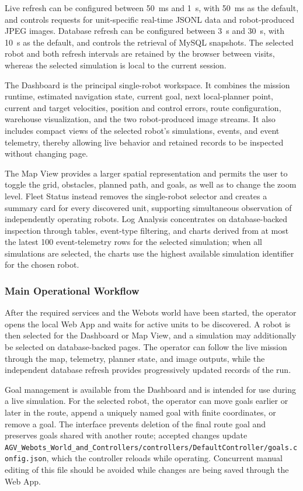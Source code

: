 Live refresh can be configured between 50~ms and 1~s, with 50~ms as the default, and controls requests for unit-specific real-time JSONL data and robot-produced JPEG images. Database refresh can be configured between 3~s and 30~s, with 10~s as the default, and controls the retrieval of MySQL snapshots. The selected robot and both refresh intervals are retained by the browser between visits, whereas the selected simulation is local to the current session.

The Dashboard is the principal single-robot workspace. It combines the mission runtime, estimated navigation state, current goal, next local-planner point, current and target velocities, position and control errors, route configuration, warehouse visualization, and the two robot-produced image streams. It also includes compact views of the selected robot's simulations, events, and event telemetry, thereby allowing live behavior and retained records to be inspected without changing page.

The Map View provides a larger spatial representation and permits the user to toggle the grid, obstacles, planned path, and goals, as well as to change the zoom level. Fleet Status instead removes the single-robot selector and creates a summary card for every discovered unit, supporting simultaneous observation of independently operating robots. Log Analysis concentrates on database-backed inspection through tables, event-type filtering, and charts derived from at most the latest 100 event-telemetry rows for the selected simulation; when all simulations are selected, the charts use the highest available simulation identifier for the chosen robot.

\subsubsection{Main Operational Workflow}

After the required services and the Webots world have been started, the operator opens the local Web App and waits for active units to be discovered. A robot is then selected for the Dashboard or Map View, and a simulation may additionally be selected on database-backed pages. The operator can follow the live mission through the map, telemetry, planner state, and image outputs, while the independent database refresh provides progressively updated records of the run.

Goal management is available from the Dashboard and is intended for use during a live simulation. For the selected robot, the operator can move goals earlier or later in the route, append a uniquely named goal with finite coordinates, or remove a goal. The interface prevents deletion of the final route goal and preserves goals shared with another route; accepted changes update \texttt{AGV\_Webots\_World\_and\_Controllers/controllers/DefaultController/goals.config.json}, which the controller reloads while operating. Concurrent manual editing of this file should be avoided while changes are being saved through the Web App.

